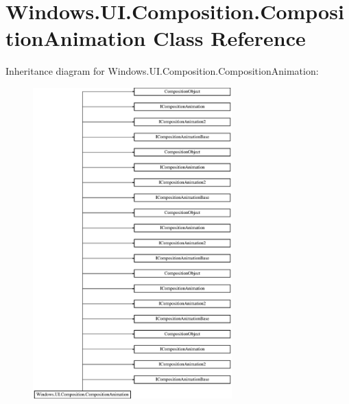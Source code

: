 \hypertarget{class_windows_1_1_u_i_1_1_composition_1_1_composition_animation}{}\section{Windows.\+U\+I.\+Composition.\+Composition\+Animation Class Reference}
\label{class_windows_1_1_u_i_1_1_composition_1_1_composition_animation}
Inheritance diagram for Windows.\+U\+I.\+Composition.\+Composition\+Animation\+:\begin{figure}[H]
\begin{center}
\leavevmode
\includegraphics[height=12.000000cm]{class_windows_1_1_u_i_1_1_composition_1_1_composition_animation}
\end{center}
\end{figure}
